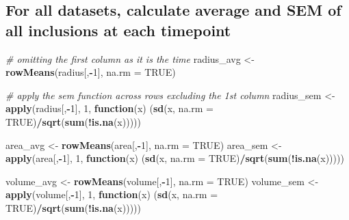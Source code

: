 \documentclass[]{article}
\newenvironment{Shaded}{\begin{snugshade}}{\end{snugshade}}
\newcommand{\CommentTok}[1]{\textcolor[rgb]{0.56,0.35,0.01}{\textit{#1}}}
\newcommand{\ControlFlowTok}[1]{\textcolor[rgb]{0.13,0.29,0.53}{\textbf{#1}}}
\newcommand{\DataTypeTok}[1]{\textcolor[rgb]{0.13,0.29,0.53}{#1}}
\newcommand{\DecValTok}[1]{\textcolor[rgb]{0.00,0.00,0.81}{#1}}
\newcommand{\KeywordTok}[1]{\textcolor[rgb]{0.13,0.29,0.53}{\textbf{#1}}}
\newcommand{\NormalTok}[1]{#1}
\newcommand{\OperatorTok}[1]{\textcolor[rgb]{0.81,0.36,0.00}{\textbf{#1}}}
\newcommand{\OtherTok}[1]{\textcolor[rgb]{0.56,0.35,0.01}{#1}}
\newcommand{\StringTok}[1]{\textcolor[rgb]{0.31,0.60,0.02}{#1}}
\begin{document}
\hypertarget{for-all-datasets-calculate-average-and-sem-of-all-inclusions-at-each-timepoint}{%
\subsection{For all datasets, calculate average and SEM of all
inclusions at each
timepoint}\label{for-all-datasets-calculate-average-and-sem-of-all-inclusions-at-each-timepoint}}

\begin{Shaded}
\begin{Highlighting}[]
\CommentTok{# omitting the first column as it is the time}
\NormalTok{radius_avg <-}\StringTok{ }\KeywordTok{rowMeans}\NormalTok{(radius[,}\OperatorTok{-}\DecValTok{1}\NormalTok{], }\DataTypeTok{na.rm =} \OtherTok{TRUE}\NormalTok{)}

\CommentTok{# apply the sem function across rows excluding the 1st column}
\NormalTok{radius_sem <-}\StringTok{ }\KeywordTok{apply}\NormalTok{(radius[,}\OperatorTok{-}\DecValTok{1}\NormalTok{], }\DecValTok{1}\NormalTok{, }\ControlFlowTok{function}\NormalTok{(x) (}\KeywordTok{sd}\NormalTok{(x, }\DataTypeTok{na.rm =} \OtherTok{TRUE}\NormalTok{)}\OperatorTok{/}\KeywordTok{sqrt}\NormalTok{(}\KeywordTok{sum}\NormalTok{(}\OperatorTok{!}\KeywordTok{is.na}\NormalTok{(x)))))}
                                                 
\NormalTok{area_avg <-}\StringTok{ }\KeywordTok{rowMeans}\NormalTok{(area[,}\OperatorTok{-}\DecValTok{1}\NormalTok{], }\DataTypeTok{na.rm =} \OtherTok{TRUE}\NormalTok{) }
\NormalTok{area_sem <-}\StringTok{ }\KeywordTok{apply}\NormalTok{(area[,}\OperatorTok{-}\DecValTok{1}\NormalTok{], }\DecValTok{1}\NormalTok{,}
                  \ControlFlowTok{function}\NormalTok{(x) (}\KeywordTok{sd}\NormalTok{(x, }\DataTypeTok{na.rm =} \OtherTok{TRUE}\NormalTok{)}\OperatorTok{/}\KeywordTok{sqrt}\NormalTok{(}\KeywordTok{sum}\NormalTok{(}\OperatorTok{!}\KeywordTok{is.na}\NormalTok{(x)))))}
                                  
\NormalTok{volume_avg <-}\StringTok{ }\KeywordTok{rowMeans}\NormalTok{(volume[,}\OperatorTok{-}\DecValTok{1}\NormalTok{], }\DataTypeTok{na.rm =} \OtherTok{TRUE}\NormalTok{)}
\NormalTok{volume_sem <-}\StringTok{ }\KeywordTok{apply}\NormalTok{(volume[,}\OperatorTok{-}\DecValTok{1}\NormalTok{], }\DecValTok{1}\NormalTok{, }\ControlFlowTok{function}\NormalTok{(x) (}\KeywordTok{sd}\NormalTok{(x, }\DataTypeTok{na.rm =} \OtherTok{TRUE}\NormalTok{)}\OperatorTok{/}\KeywordTok{sqrt}\NormalTok{(}\KeywordTok{sum}\NormalTok{(}\OperatorTok{!}\KeywordTok{is.na}\NormalTok{(x)))))}
\end{Highlighting}
\end{Shaded}
\end{document}
